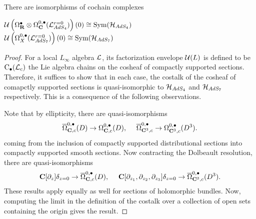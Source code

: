 \documentclass[../main.tex]{subfiles}
\begin{document}
\begin{prop}\label{prop:altstates}
There are isomorphisms of cochain complexes
\begin{center}
$\mathcal{U} \left ( \Omega^\bullet_{\mathbf{R}}\otimes \Omega^{0,\bullet}_{\mathbf{C}} (\mathcal{L}_{AdS_4}^{r=0} ) \right )(0)\cong \text{Sym}( \mathcal{H}_{AdS_4} )$ \\
$\mathcal{U} \left ( \Omega^{0,\bullet}_{X}(\mathcal{L}_{AdS_7}^{r=0})\right )(0)\cong \text{Sym}( \mathcal{H}_{AdS_7} )$
\end{center}
\end{prop}
\begin{proof}
For a local $L_\infty$ algebra $\mathcal{L}$, its factorization envelope $\mathcal{U}(L)$ is defined to be ${\mathrm{C}}_\bullet (\mathcal{L}_c)$ the Lie algebra chains on the cosheaf of compactly supported sections. Therefore, it suffices to show that in each case, the costalk of the cosheaf of comapctly supported sections is quasi-isomorphic to $\mathcal{H}_{AdS_4}$ and $\mathcal{H}_{AdS_7}$ respectively. This is a consequence of the following observations.

Note that by ellipticity, there are quasi-isomorphisms 
\[\overline \Omega^{0,\bullet}_{\mathbf{C},c} (D) \to \Omega^{0,\bullet}_{\mathbf{C},c} (D), \ \ \ \ \overline \Omega^{0,\bullet}_{\mathbf{C}^3,c} \to \Omega^{0,\bullet}_{\mathbf{C}^3,c} (D^3).\]
coming from the inclusion of compactly supported distributional sections into compactly supported smooth sections. Now contracting the Dolbeault resolution, there are quasi-isomorphisms
\[\mathbf{C}[\partial_z]\delta_{z=0} \to \overline \Omega^{0,\bullet}_{\mathbf{C},c} (D), \ \ \ \ \mathbf{C}[\partial_{z_1}, \partial_{z_2}, \partial_{z_3}]\delta_{z=0} \to \overline \Omega^{0,\bullet}_{\mathbf{C}^3,c} (D^3).\]
These results apply equally as well for sections of holomorphic bundles. Now, computing the limit in the definition of the costalk over a collection of open sets containing the origin gives the result.
\end{proof}
\end{document}
